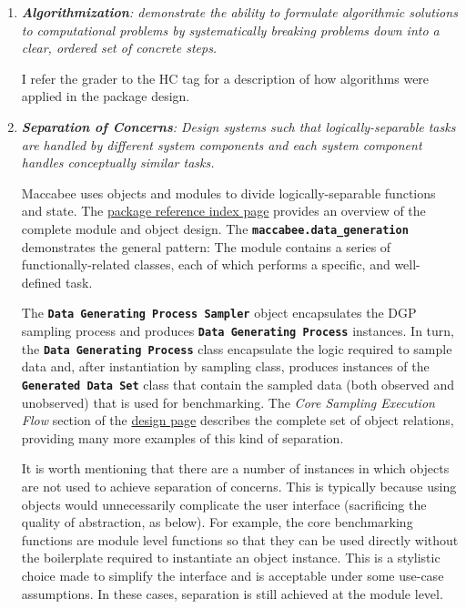 \documentclass[../main.tex]{subfiles}
\begin{document}
\begin{enumerate}
    \item \textit{\textbf{Algorithmization}: demonstrate the ability to formulate algorithmic solutions to computational problems by systematically breaking problems down into a clear, ordered set of concrete steps.}
    
    I refer the grader to the  HC tag for a description of how algorithms were applied in the package design.
    
    \item \textit{\textbf{Separation of Concerns}: Design systems such that logically-separable tasks are handled by different system components and each system component handles conceptually similar tasks.}
    
    Maccabee uses objects and modules to divide logically-separable functions and state. The \href{\RTDurl/reference.html}{package reference index page} provides an overview of the complete module and object design. The \textbf{\lstinline{maccabee.data_generation}} demonstrates the general pattern: The module contains a series of functionally-related classes, each of which performs a specific, and well-defined task.
    
    The \textbf{\texttt{Data Generating Process Sampler}} object encapsulates the DGP sampling process and produces \textbf{\texttt{Data Generating Process}} instances. In turn, the \textbf{\texttt{Data Generating Process}} class encapsulate the logic required to sample data and, after instantiation by sampling class, produces instances of the \textbf{\texttt{Generated Data Set}} class that contain the sampled data (both observed and unobserved) that is used for benchmarking. The \textit{Core Sampling Execution Flow} section of the \href{\RTDurl/design.html}{design page} describes the complete set of object relations, providing many more examples of this kind of separation.
    
    It is worth mentioning that there are a number of instances in which objects are not used to achieve separation of concerns. This is typically because using objects would unnecessarily complicate the user interface (sacrificing the quality of abstraction, as below). For example, the core benchmarking functions are module level functions so that they can be used directly without the boilerplate required to instantiate an object instance. This is a stylistic choice made to simplify the interface and is acceptable under some use-case assumptions. In these cases, separation is still achieved at the module level.
    

\end{enumerate}
\end{document}
